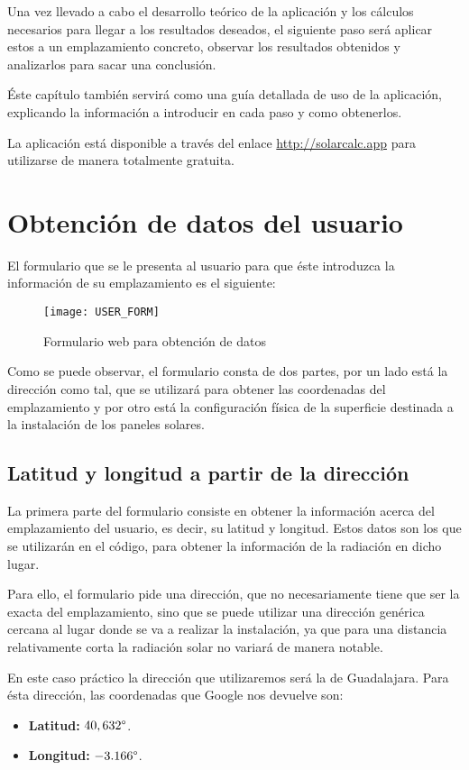 Una vez llevado a cabo el desarrollo teórico de la aplicación y los cálculos necesarios para llegar a los resultados deseados, el siguiente paso será aplicar estos a un emplazamiento concreto, observar los resultados obtenidos y analizarlos para sacar una conclusión.

Éste capítulo también servirá como una guía detallada de uso de la aplicación, explicando la información a introducir en cada paso y como obtenerlos.

La aplicación está disponible a través del enlace \url{http://solarcalc.app} para utilizarse de manera totalmente gratuita.

\section{Obtención de datos del usuario}

El formulario que se le presenta al usuario para que éste introduzca la información de su emplazamiento es el siguiente:
\begin{figure}[ht]
\texttt{[image: USER\_FORM]}
\centering
\caption{Formulario web para obtención de datos}
\label{fig:user_form}
\end{figure}

Como se puede observar, el formulario consta de dos partes, por un lado está la dirección como tal, que se utilizará para obtener las coordenadas del emplazamiento y por otro está la configuración física de la superficie destinada a la instalación de los paneles solares.

\subsection{Latitud y longitud a partir de la dirección}

La primera parte del formulario consiste en obtener la información acerca del emplazamiento del usuario, es decir, su latitud y longitud. Estos datos son los que se utilizarán en el código, para obtener la información de la radiación en dicho lugar.

Para ello, el formulario pide una dirección, que no necesariamente tiene que ser la exacta del emplazamiento, sino que se puede utilizar una dirección genérica cercana al lugar donde se va a realizar la instalación, ya que para una distancia relativamente corta la radiación solar no variará de manera notable.

En este caso práctico la dirección que utilizaremos será la de Guadalajara. Para ésta dirección, las coordenadas que Google nos devuelve son:
\begin{itemize}
\item \textbf{Latitud:} $40,632 \degree$.
\item \textbf{Longitud:} $-3.166 \degree$.
\end{itemize}

